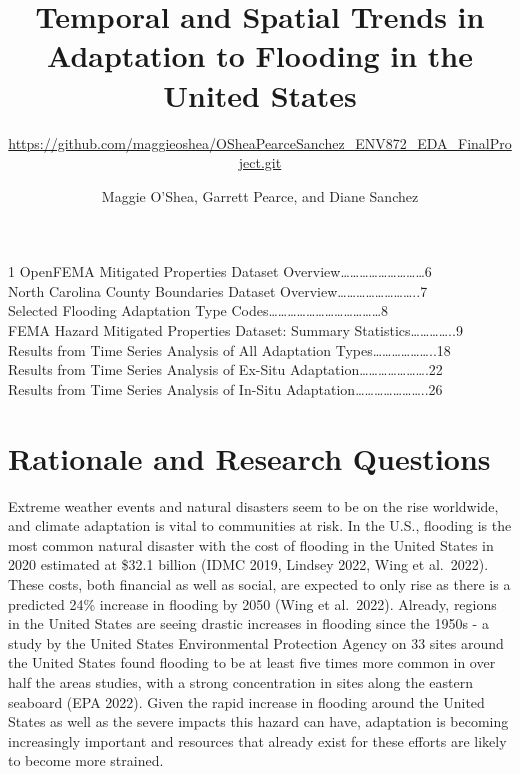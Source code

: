 \documentclass[
  12pt,
]{article}
\title{Temporal and Spatial Trends in Adaptation to Flooding in the
United States}
\subtitle{\url{https://github.com/maggieoshea/OSheaPearceSanchez_ENV872_EDA_FinalProject.git}}
\author{Maggie O'Shea, Garrett Pearce, and Diane Sanchez}
\date{}
\begin{document}
\maketitle

\newpage
\tableofcontents 
\newpage
\listoftables

1 OpenFEMA Mitigated Properties Dataset
Overview\ldots\ldots\ldots\ldots\ldots\ldots\ldots\ldots\ldots6\\
 North Carolina County Boundaries Dataset
Overview\ldots\ldots\ldots\ldots\ldots\ldots\ldots\ldots..7\\
 Selected Flooding Adaptation Type
Codes\ldots\ldots\ldots\ldots\ldots\ldots\ldots\ldots\ldots\ldots\ldots\ldots8\\
 FEMA Hazard Mitigated Properties Dataset: Summary
Statistics\ldots\ldots\ldots\ldots..9\\
 Results from Time Series Analysis of All Adaptation
Types\ldots\ldots\ldots\ldots\ldots\ldots..18\\
 Results from Time Series Analysis of Ex-Situ
Adaptation\ldots\ldots\ldots\ldots\ldots\ldots\ldots.22\\
 Results from Time Series Analysis of In-Situ
Adaptation\ldots\ldots\ldots\ldots\ldots\ldots\ldots..26\\
\newpage

\listoffigures 
\newpage

\newpage

\hypertarget{rationale-and-research-questions}{%
\section{Rationale and Research
Questions}\label{rationale-and-research-questions}}

Extreme weather events and natural disasters seem to be on the rise
worldwide, and climate adaptation is vital to communities at risk. In
the U.S., flooding is the most common natural disaster with the cost of
flooding in the United States in 2020 estimated at \$32.1 billion (IDMC
2019, Lindsey 2022, Wing et al.~2022). These costs, both financial as
well as social, are expected to only rise as there is a predicted 24\%
increase in flooding by 2050 (Wing et al.~2022). Already, regions in the
United States are seeing drastic increases in flooding since the 1950s -
a study by the United States Environmental Protection Agency on 33 sites
around the United States found flooding to be at least five times more
common in over half the areas studies, with a strong concentration in
sites along the eastern seaboard (EPA 2022). Given the rapid increase in
flooding around the United States as well as the severe impacts this
hazard can have, adaptation is becoming increasingly important and
resources that already exist for these efforts are likely to become more
strained.
\end{document}
